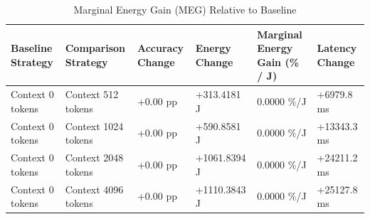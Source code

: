\begin{table}
\caption{Marginal Energy Gain (MEG) Relative to Baseline}
\label{tab:marginal_energy_gain}
\begin{tabular}{llllll}
\toprule
Baseline Strategy & Comparison Strategy & Accuracy Change & Energy Change & Marginal Energy Gain (\% / J) & Latency Change \\
\midrule
Context 0 tokens & Context 512 tokens & +0.00 pp & +313.4181 J & 0.0000 \%/J & +6979.8 ms \\
Context 0 tokens & Context 1024 tokens & +0.00 pp & +590.8581 J & 0.0000 \%/J & +13343.3 ms \\
Context 0 tokens & Context 2048 tokens & +0.00 pp & +1061.8394 J & 0.0000 \%/J & +24211.2 ms \\
Context 0 tokens & Context 4096 tokens & +0.00 pp & +1110.3843 J & 0.0000 \%/J & +25127.8 ms \\
\bottomrule
\end{tabular}
\end{table}
